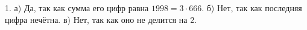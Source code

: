1. а) Да, так как сумма его цифр равна $1998=3\cdot666.$ б) Нет, так как последняя цифра нечётна. в) Нет, так как оно не делится на 2.\\
